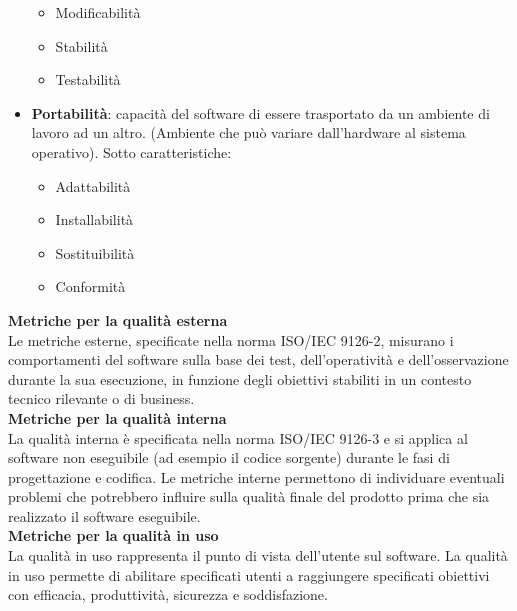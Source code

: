 \begin{itemize}
\begin{itemize}
\item Modificabilità
\item Stabilità
\item Testabilità
\end{itemize}
\item \textbf{Portabilità}: capacità del software di essere trasportato da un ambiente di lavoro ad un altro. (Ambiente che può variare dall'hardware al sistema operativo).
Sotto caratteristiche:
\begin{itemize}
\item Adattabilità
\item Installabilità
\item Sostituibilità
\item Conformità
\end{itemize}
\end{itemize}
\textbf{Metriche per la qualità esterna}\\
Le metriche esterne, specificate nella norma ISO/IEC 9126-2, misurano i comportamenti del software sulla base dei test, dell'operatività e dell'osservazione durante la sua esecuzione, in funzione degli obiettivi stabiliti in un contesto tecnico rilevante o di business.\\
\textbf{Metriche per la qualità interna}\\
La qualità interna è specificata nella norma ISO/IEC 9126-3 e si applica al software non eseguibile (ad esempio il codice sorgente) durante le fasi di progettazione e codifica. 
Le metriche interne permettono di individuare eventuali problemi che potrebbero influire sulla qualità finale del prodotto prima che sia realizzato il software eseguibile.\\
\textbf{Metriche per la qualità in uso}\\
La qualità in uso rappresenta il punto di vista dell'utente sul software. La qualità in uso permette di abilitare specificati utenti a raggiungere specificati obiettivi con efficacia, produttività, sicurezza e soddisfazione.
